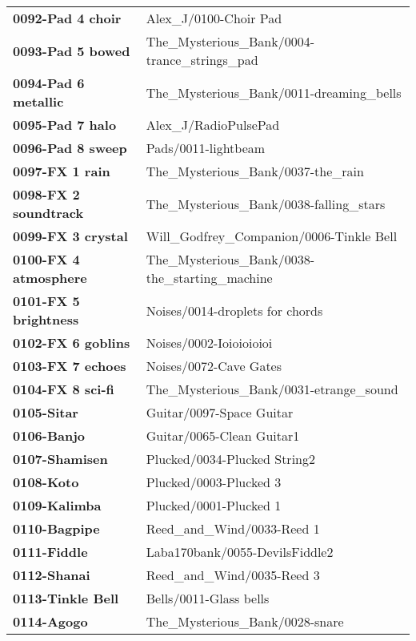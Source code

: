 \begin{longtable}{|l l|}
      \textbf{0092-Pad 4 choir} &
         Alex\_J/0100-Choir Pad \\
      \textbf{0093-Pad 5 bowed} &
         The\_Mysterious\_Bank/0004-trance\_strings\_pad \\
      \textbf{0094-Pad 6 metallic} &
         The\_Mysterious\_Bank/0011-dreaming\_bells \\
      \textbf{0095-Pad 7 halo} &
         Alex\_J/RadioPulsePad \\
      \textbf{0096-Pad 8 sweep} &
         Pads/0011-lightbeam \\
      \textbf{0097-FX 1 rain} &
         The\_Mysterious\_Bank/0037-the\_rain \\
      \textbf{0098-FX 2 soundtrack} &
         The\_Mysterious\_Bank/0038-falling\_stars \\
      \textbf{0099-FX 3 crystal} &
         Will\_Godfrey\_Companion/0006-Tinkle Bell \\
      \textbf{0100-FX 4 atmosphere} &
         The\_Mysterious\_Bank/0038-the\_starting\_machine \\
      \textbf{0101-FX 5 brightness} &
         Noises/0014-droplets for chords \\
      \textbf{0102-FX 6 goblins} &
         Noises/0002-Ioioioioioi \\
      \textbf{0103-FX 7 echoes} &
         Noises/0072-Cave Gates \\
      \textbf{0104-FX 8 sci-fi} &
         The\_Mysterious\_Bank/0031-etrange\_sound \\
      \textbf{0105-Sitar} &
         Guitar/0097-Space Guitar \\
      \textbf{0106-Banjo} &
         Guitar/0065-Clean Guitar1 \\
      \textbf{0107-Shamisen} &
         Plucked/0034-Plucked String2 \\
      \textbf{0108-Koto} &
         Plucked/0003-Plucked 3 \\
      \textbf{0109-Kalimba} &
         Plucked/0001-Plucked 1 \\
      \textbf{0110-Bagpipe} &
         Reed\_and\_Wind/0033-Reed 1 \\
      \textbf{0111-Fiddle} &
         Laba170bank/0055-DevilsFiddle2 \\
      \textbf{0112-Shanai} &
         Reed\_and\_Wind/0035-Reed 3 \\
      \textbf{0113-Tinkle Bell} &
         Bells/0011-Glass bells \\
      \textbf{0114-Agogo} &
         The\_Mysterious\_Bank/0028-snare \\

\end{longtable}
